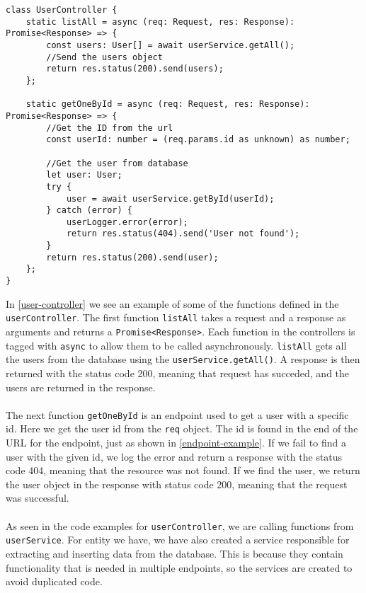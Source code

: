 \begin{lstlisting}[caption={Shows some of the endpoints from the UserController}, captionpos=b, label={user-controller}]
class UserController {
	static listAll = async (req: Request, res: Response): Promise<Response> => {
		const users: User[] = await userService.getAll();
		//Send the users object
		return res.status(200).send(users);
    };

    static getOneById = async (req: Request, res: Response): Promise<Response> => {
		//Get the ID from the url
		const userId: number = (req.params.id as unknown) as number;

		//Get the user from database
		let user: User;
		try {
			user = await userService.getById(userId);
		} catch (error) {
			userLogger.error(error);
			return res.status(404).send('User not found');
		}
		return res.status(200).send(user);
	};
}
\end{lstlisting}
In \autoref{user-controller} we see an example of some of the functions defined in the \texttt{userController}.
The first function \texttt{listAll} takes a request and a response as arguments and returns a \texttt{Promise<Response>}.
Each function in the controllers is tagged with \texttt{async} to allow them to be called asynchronously. 
\texttt{listAll} gets all the users from the database using the \texttt{userService.getAll()}.
A response is then returned with the status code 200, meaning that request has succeded, and the users are returned in the response. 
\\\\
The next function \texttt{getOneById} is an endpoint used to get a user with a specific id. 
Here we get the user id from the \texttt{req} object. 
The id is found in the end of the URL for the endpoint, just as shown in \autoref{endpoint-example}.
If we fail to find a user with the given id, we log the error and return a response with the status code 404, meaning that the resource was not found.
If we find the user, we return the user object in the response with status code 200, meaning that the request was successful.
\\\\
As seen in the code examples for \texttt{userController}, we are calling functions from \texttt{userService}. 
For entity we have, we have also created a service responsible for extracting and inserting data from the database.
This is because they contain functionality that is needed in multiple endpoints, so the services are created to avoid duplicated code.
